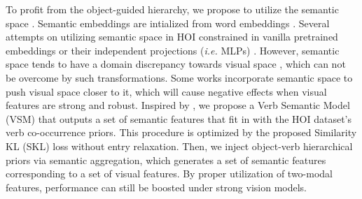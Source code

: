 \documentclass[letterpaper]{article} %
\begin{document}






To profit from the object-guided hierarchy, we propose to utilize the semantic space \cite{rahman2020anyshot,xu2019HOIwithknowledge}. Semantic embeddings are intialized from word embeddings \cite{pennington2014glove,mikolov2013word2vec}. Several attempts on utilizing semantic space in HOI constrained in vanilla pretrained embeddings or their independent projections (\textit{i.e.} MLPs) \cite{zhong2020polysemy,gao2020DRG,bansal2020functionalgeneralization,peyre2019HOIwithanalogy}. However, semantic space tends to have a domain discrepancy towards visual space \cite{zhu2021semanticrelation}, which can not be overcome by such transformations. Some works \cite{xu2019HOIwithknowledge,peyre2019HOIwithanalogy} incorporate semantic space to push visual space closer to it, which will cause negative effects when visual features are strong and robust. Inspired by \cite{wu2018nonparametric_instance,you2020multilabelMSE}, we propose a Verb Semantic Model (VSM) that outputs a set of semantic features that fit in with the HOI dataset's verb co-occurrence priors. This procedure is optimized by the proposed Similarity KL (SKL) loss without entry relaxation. Then, we inject object-verb hierarchical priors via semantic aggregation, which generates a set of semantic features corresponding to a set of visual features. By proper utilization of two-modal features, performance can still be boosted under strong vision models. 
\end{document}
